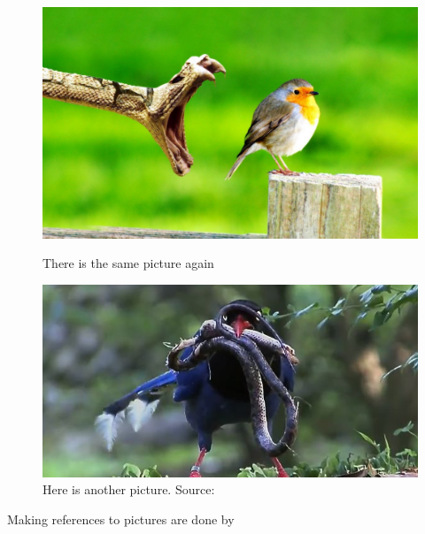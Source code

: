 \begin{figure} [h]
\begin{minipage}[t]{0.6\textwidth}
\centering
\includegraphics[width=1\textwidth]{Pictures/Example.jpg}
\caption{There is the same picture again}
\label{Bird4}
\end{minipage}
\hspace{0.05\textwidth}
\begin{minipage}[t]{0.3\textwidth}
\centering
\includegraphics[width=1\textwidth]{Pictures/Example2.jpg}
\caption{Here is another picture. Source: \citet{isover}}
\label{Bird5}
\end{minipage}
\end{figure}







Making references to pictures are done by 